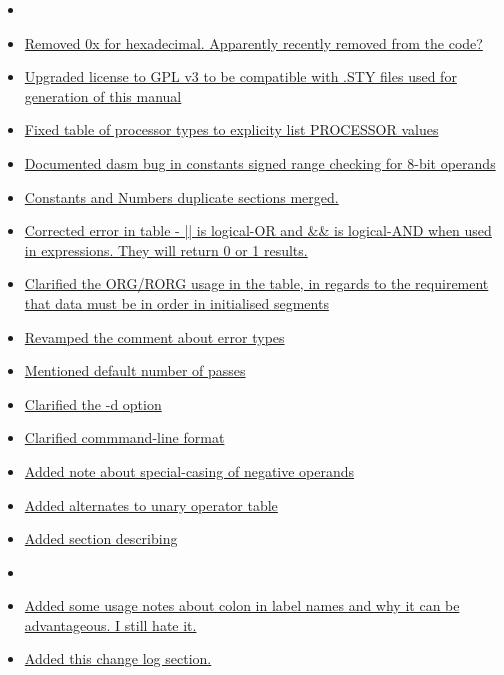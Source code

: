 \begin{itemize}
\item[]
\item \hyperref[changelog:20200824const]{Removed 0x for hexadecimal. Apparently recently removed from the code?}
\item \hyperref[changelog:20200824license]{Upgraded license to GPL v3 to be compatible with .STY files used for generation of this manual}
\item \hyperref[changelog:20200824processor]{Fixed table of processor types to explicity list PROCESSOR values}
\item \hyperref[changelog:20200824rangebug]{Documented dasm bug in constants signed range checking for 8-bit operands}
\item \hyperref[changelog:20200824const]{Constants and Numbers duplicate sections merged.}
\item \hyperref[changelog:20200824arithmetic]{Corrected error in table - || is logical-OR and \&\& is logical-AND when used in expressions. They will return 0 or 1 results.}
\item \hyperref[changelog:20200824org]{Clarified the ORG/RORG usage in the  table, in regards to the requirement that data must be in order in initialised segments}
\item \hyperref[changelog:20200824error]{Revamped the comment about error types}
\item \hyperref[changelog:20200824passes]{Mentioned default number of passes}
\item \hyperref[changelog:20200824developers]{Clarified the -d option}
\item \hyperref[changelog:20200824sourcefile]{Clarified commmand-line format}
\item \hyperref[changelog:specialcase]{Added note about special-casing of negative operands}
\item \hyperref[changelog:alternateunary]{Added alternates to unary operator table}
\item \hyperref[section:numberformat]{Added section describing }

\item[]
\item \hyperref[changelog:20200823colon]{Added some usage notes about colon in label names and why it can be advantageous. I still hate it.}
\item \hyperref[section:changelog]{Added this change log section.}
\end{itemize}


